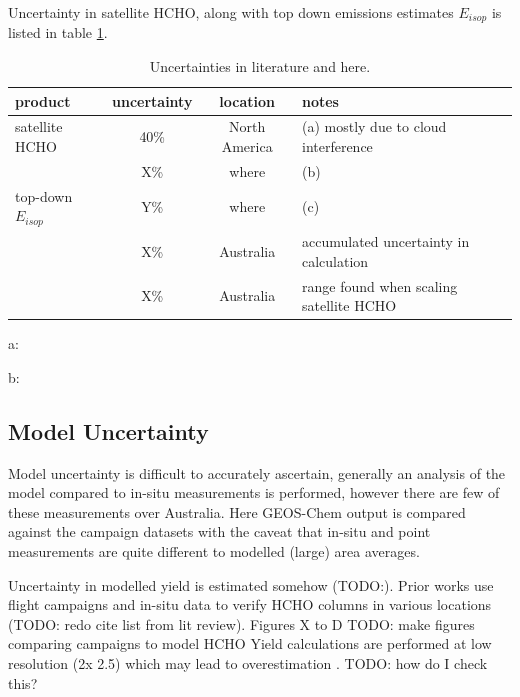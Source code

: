   Uncertainty in satellite HCHO, along with top down emissions estimates $E_{isop}$ is listed in table \ref{Model:Uncertainty:tab_uncertainties}.
  \begin{table}\begin{threeparttable}
    \caption{Uncertainties in literature and here.}
    \begin{tabular}{ l | c  c  l } 
      \toprule
      product & uncertainty & location & notes \\
      \midrule
      satellite HCHO & 40\% & North America & (a) mostly due to cloud interference \\
       & X\% & where & (b) \\
      top-down $E_{isop}$ & Y\% & where & (c) \\
       & X\% & Australia & accumulated uncertainty in calculation \\
       & X\% & Australia & range found when scaling satellite HCHO \\
      \bottomrule
    \end{tabular}
    \begin{tablenotes} 
      \item a: \textcite{Millet2006,Palmer2006}
      \item b: 
    \end{tablenotes}
    \label{Model:Uncertainty:tab_uncertainties}
  \end{threeparttable}\end{table}
  
  \subsection{Model Uncertainty}
    \label{Model:Uncertainty:Model}
    
    
    Model uncertainty is difficult to accurately ascertain, generally an analysis of the model compared to in-situ measurements is performed, however there are few of these measurements over Australia.
    Here GEOS-Chem output is compared against the campaign datasets with the caveat that in-situ and point measurements are quite different to modelled (large) area averages.
    
    
    Uncertainty in modelled yield is estimated somehow (TODO:).
    Prior works use flight campaigns and in-situ data to verify HCHO columns in various locations (TODO: redo cite list from lit review).
    Figures X to D TODO: make figures comparing campaigns to model HCHO
    Yield calculations are performed at low resolution (2\degr x 2.5\degr) which may lead to overestimation \parencite{Yu2016}.
    TODO: how do I check this?
    

